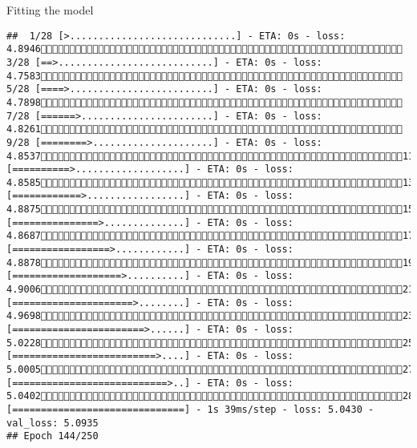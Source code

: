 \documentclass[
  ignorenonframetext,
]{beamer}
\begin{document}
\begin{frame}[fragile]{Fitting the model}
\begin{verbatim}
##  1/28 [>.............................] - ETA: 0s - loss: 4.8946 3/28 [==>...........................] - ETA: 0s - loss: 4.7583 5/28 [====>.........................] - ETA: 0s - loss: 4.7898 7/28 [======>.......................] - ETA: 0s - loss: 4.8261 9/28 [========>.....................] - ETA: 0s - loss: 4.853711/28 [==========>...................] - ETA: 0s - loss: 4.858513/28 [============>.................] - ETA: 0s - loss: 4.887515/28 [===============>..............] - ETA: 0s - loss: 4.868717/28 [=================>............] - ETA: 0s - loss: 4.887819/28 [===================>..........] - ETA: 0s - loss: 4.900621/28 [=====================>........] - ETA: 0s - loss: 4.969823/28 [=======================>......] - ETA: 0s - loss: 5.022825/28 [=========================>....] - ETA: 0s - loss: 5.000527/28 [===========================>..] - ETA: 0s - loss: 5.040228/28 [==============================] - 1s 39ms/step - loss: 5.0430 - val_loss: 5.0935
## Epoch 144/250

\end{verbatim}
\end{frame}
\end{document}

